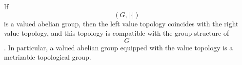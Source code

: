 If $$(G, |\cdot|)$$ is a valued abelian group, then the left value topology coincides with the right value topology, and this topology is compatible with the group structure of $$G$$. In particular, a valued abelian group equipped with the value topology is a metrizable topological group.
